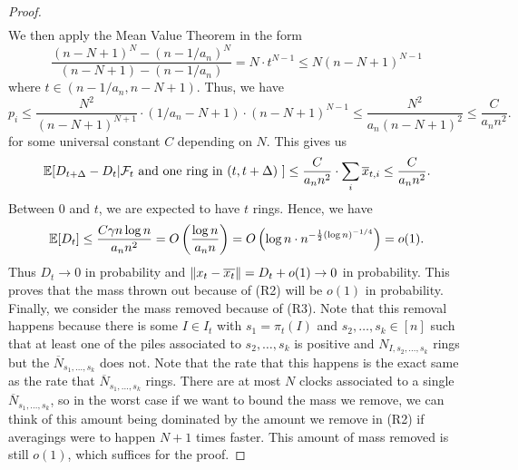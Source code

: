 \documentclass[12pt]{article}
\begin{document}
\begin{proof}
\begin{align*}
	\end{align*}
	We then apply the Mean Value Theorem in the form
	\[
		\frac{(n-N+1)^N - (n-1/a_n)^N}{(n-N+1) - (n-1/a_n)} = N \cdot t^{N-1} \leq N (n-N+1)^{N-1}
	\]
	where $t \in (n-1/a_n, n-N+1)$. Thus, we have
	\[
		p_i \leq \frac{N^2}{(n-N+1)^{N+1}} \cdot (1/a_n - N + 1) \cdot (n-N+1)^{N-1} \leq \frac{N^2}{a_n (n-N+1)^2} \leq \frac{C}{a_n n^2}.
	\]
	for some universal constant $C$ depending on $N$. This gives us 
	\[
		\mathbb{E} [ D_{t + \Delta} - D_t | \mathcal{F}_t \text{ and one ring in $(t, t + \Delta)$ } ] \leq \frac{C}{a_n n^2} \cdot \sum_i \overline{x}_{t, i} \leq \frac{C}{a_n n^2}.
	\]
	Between $0$ and $t$, we are expected to have $t$ rings. Hence, we have 
	\[
		\mathbb{E} [D_t] \leq \frac{C \gamma n \log n}{a_n n^2} = O \left ( \frac{\log n}{a_n n} \right ) = O \left ( \log n \cdot n^{- \frac{1}{2}(\log n)^{-1/4}} \right ) = o(1). 
	\]
	Thus $D_t \to 0$ in probability and $\left\lVert x_t - \overline{x_t} \right\rVert = D_t + o(1) \to 0$ in probability. This proves that the mass thrown out because of (R2) will be $o(1)$ in probability. Finally, we consider the mass removed because of (R3). Note that this removal happens because there is some $I \in I_t$ with $s_1 = \pi_t(I)$ and $s_2, \ldots, s_k \in [n]$ such that at least one of the piles associated to $s_2, \ldots, s_k$ is positive and $N_{I, s_2, \ldots, s_k}$ rings but the $\overline{N}_{s_1, \ldots, s_k}$ does not. Note that the rate that this happens is the exact same as the rate that $\overline{N}_{s_1, \ldots, s_k}$ rings. There are at most $N$ clocks associated to a single $\overline{N}_{s_1, \ldots, s_k}$, so in the worst case if we want to bound the mass we remove, we can think of this amount being dominated by the amount we remove in (R2) if averagings were to happen $N+1$ times faster. This amount of mass removed is still $o(1)$, which suffices for the proof. 
\end{proof}
\end{document}
